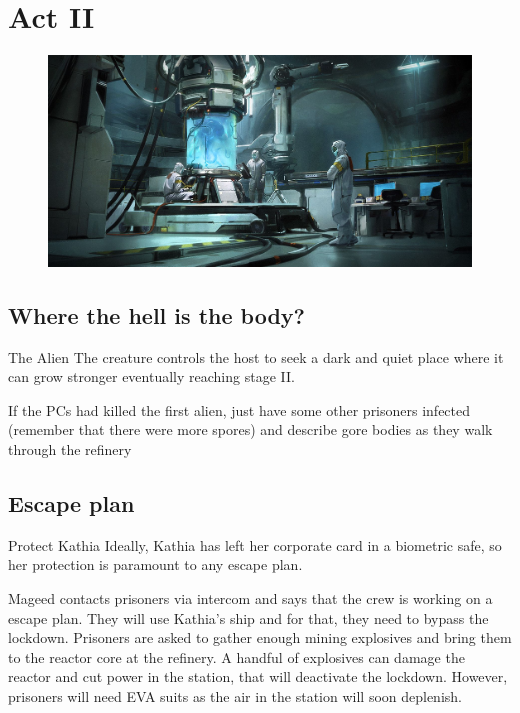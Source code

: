 \chapter{Act II}



\begin{figure}
   \centering
   \includegraphics[width=1.0\textwidth]{img/bg/lab.jpg}
\end{figure}


\section{Where the hell is the body?}


\begin{rpg-commentbox}{The Alien}
   The creature controls the host to seek a dark and quiet place where it can grow stronger eventually reaching stage II.

    
    \medskip

    If the PCs had killed the first alien, just have some other prisoners infected (remember that there were more spores)
    and describe gore bodies as they walk through the refinery
\end{rpg-commentbox}




\newsect

\section{Escape plan}


\begin{rpg-commentbox}{Protect Kathia}
    Ideally, Kathia has left her corporate card in a biometric safe, so her protection is paramount to any escape plan.

    Mageed contacts prisoners via intercom and says that the crew is working on a escape plan. They will use Kathia's ship and for that, they need to bypass the lockdown.
    Prisoners are asked to gather enough mining explosives and bring them to the reactor core at the refinery. A handful of explosives can damage the reactor and cut power in the station, that will deactivate the lockdown. However, prisoners will need EVA suits as the air in the station will soon deplenish.
 \end{rpg-commentbox}


